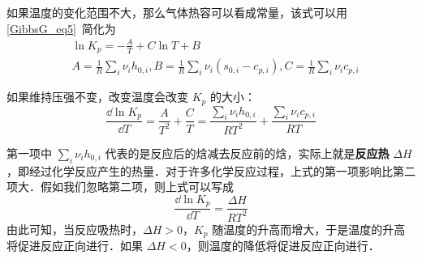 如果温度的变化范围不大，那么气体热容可以看成常量，该式可以用\autoref{GibbsG_eq5}~简化为
\begin{equation}
\begin{aligned}
&\ln K_p=-\frac{A}{T}+C\ln T+B\\
&A=\frac{1}{R} \sum_i \nu_i h_{0,i},B=\frac{1}{R}\sum_i \nu_i(s_{0,i}-c_{p,i}),C=\frac{1}{R}\sum_i \nu_ic_{p,i}
\end{aligned}
\end{equation}

如果维持压强不变，改变温度会改变 $K_p$ 的大小：
\begin{equation}
\frac{\dd \ln K_p}{\dd T}=\frac{A}{T^2}+\frac{C}{T}=\frac{\sum_i\nu_ih_{0,i}}{RT^2}+\frac{\sum_i\nu_ic_{p,i}}{RT}
\end{equation}

第一项中 $\sum_i \nu_i h_{0,i}$ 代表的是反应后的焓减去反应前的焓，实际上就是\textbf{反应热} $\Delta H$，即经过化学反应产生的热量．对于许多化学反应过程，上式的第一项影响比第二项大．假如我们忽略第二项，则上式可以写成
\begin{equation}
\frac{\dd \ln K_p}{\dd T}=\frac{\Delta H}{RT^2}
\end{equation}
由此可知，当反应吸热时，$\Delta H>0$，$K_p$ 随温度的升高而增大，于是温度的升高将促进反应正向进行．如果 $\Delta H<0$，则温度的降低将促进反应正向进行．